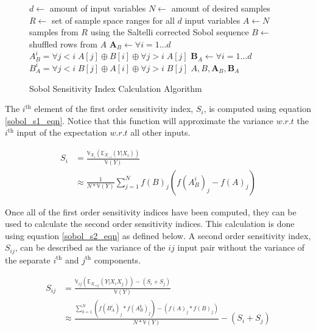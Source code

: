 \begin{figure}
  \label{fig:sobol_sample_alg}
    \begin{algorithmic}[1]
      \State $d \gets $ amount of input variables
      \State $N \gets $ amount of desired samples
      \State $R \gets $ set of sample space ranges for all $d$ input variables
      \State $A \gets N$ samples from $R$ using the Saltelli corrected Sobol sequence
      \State $B \gets $ shuffled rows from $A$
      \State $\textbf{A}_{B} \gets \forall i = 1 \ldots d$ $A_{B}^i = \forall j < i \; A[j] \oplus B[i] \oplus \forall j > i \; A[j]$
      \State $\textbf{B}_{A} \gets \forall i = 1 \ldots d$ $B_{A}^i = \forall j < i \; B[j] \oplus A[i] \oplus \forall j > i \; B[j]$
      \State \Return $A, B, \textbf{A}_{B}, \textbf{B}_{A}$
    \end{algorithmic}
  \caption{Sobol Sensitivity Index Calculation Algorithm}
\end{figure}


The $i^{\text{th}}$ element of the first order sensitivity index, $S_i$, is computed using equation \ref{sobol_s1_eqn}. Notice that this function will approximate the variance $w.r.t$ the $i^{\text{th}}$ input of the expectation $w.r.t$ all other inputs.

\begin{equation} \label{sobol_s1_eqn}
  \begin{split}
    S_i & = \frac{\mathbb{V}_{X_i}\left(\mathbb{E}_{X_{\sim i}}(Y | X_i) \right)}{\mathbb{V}(Y)} \\
     & \approx \frac{1}{N * \mathbb{V}(Y)} \sum_{j=1}^{N} f(B)_j\left( f(A_{B}^{i})_j - f(A)_j\right)
  \end{split}
\end{equation}

Once all of the first order sensitivity indices have been computed, they can be used to calculate the second order sensitivity indices. This calculation is done using equation \ref{sobol_s2_eqn} as defined below. A second order sensitivity index, $S_{ij}$, can be described as the variance of the $ij$ input pair without the variance of the separate $i^{\text{th}}$ and $j^{\text{th}}$ components.

\begin{equation} \label{sobol_s2_eqn}
  \begin{split}
    S_{ij} & = \frac{\mathbb{V}_{ij}\left(\mathbb{E}_{X_{\sim ij}}(Y | X_i X_j)\right)  - (S_i + S_j)}{\mathbb{V}(Y)} \\
     & \approx \frac{\sum_{k=1}^{N} \left(f(B_{A}^{i})_j * f(A_{B}^{k})_j\right) - \left(f(A)_j * f(B)_j\right)}{N * \mathbb{V}(Y)} - (S_i + S_j)
  \end{split}
\end{equation}

